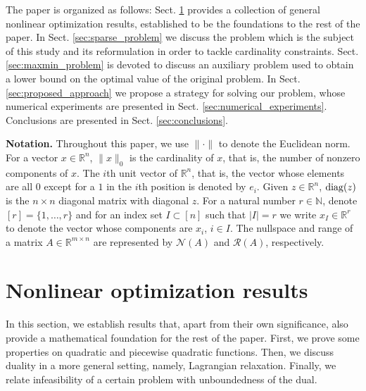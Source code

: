 \documentclass[smallextended,referee,envcountsect]{svjour3}
\newcommand{\R}{\mathbb{R}}
\newcommand{\N}{\mathbb{N}}
\newcommand{\Ademir}[1]{{\color{Ademir} #1}} %
\begin{document}
The paper is organized as follows: Sect. \ref{sec:general_nlp} provides a 
collection of general nonlinear optimization results, established to be the foundations 
to the rest of the paper. In Sect. \ref{sec:sparse_problem} we discuss the problem which 
is the subject of this study and its reformulation in order to tackle cardinality 
constraints. Sect. \ref{sec:maxmin_problem} is devoted to discuss an auxiliary problem 
used to obtain a lower bound on the optimal value of the original problem. In 
Sect. \ref{sec:proposed_approach} we propose a strategy for solving our problem, whose 
numerical experiments are presented in Sect. \ref{sec:numerical_experiments}. 
Conclusions are presented in Sect. \ref{sec:conclusions}.

\medskip

{\noindent\bf Notation.} Throughout this paper, we use $\|\cdot\|$ to denote the 
Euclidean norm. For a vector $x\in\R^n$, $\|x\|_0$ is the cardinality of $x$, that is, 
the number of nonzero components of $x$. The $i$th unit vector of $\R^n$, that is, 
the vector whose elements are all $0$ except for a $1$ in the $i$th position is denoted 
by $e_i$. Given $z\in\R^n$, ${\rm diag}(z)$ is the $n\times n$ diagonal matrix with 
diagonal $z$. For a natural number $r\in\N$, denote $[r]=\{1,\ldots,r\}$ and for an 
index set $I\subset[n]$ such that $|I|=r$ we write $x_I\in\R^r$ to denote the vector 
whose components are $x_i$, $i\in I$. \Ademir{The nullspace and range of a matrix 
$A\in\R^{m\times n}$ are represented by ${\mathcal{N}}(A)$ and 
${\mathcal{R}}(A)$, respectively.}


\section{Nonlinear optimization results}
\label{sec:general_nlp}
In this section, we establish results that, apart from their own significance, 
also provide a mathematical foundation for the rest of the paper. First, we prove some 
properties on quadratic and piecewise quadratic functions. Then, we discuss duality in a more 
general setting, namely, Lagrangian relaxation. Finally, we relate infeasibility of a 
certain problem with unboundedness of the dual.
\end{document}
